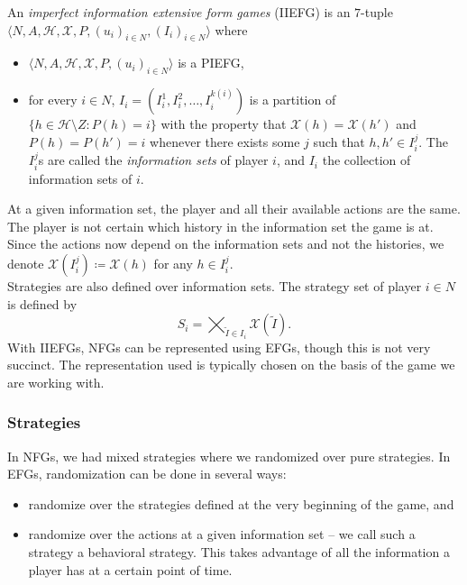 	\begin{fdef}
		An \emph{imperfect information extensive form games} (IIEFG) is an $7$-tuple $\langle N,A,\mathcal{H},\mathcal{X},P,(u_i)_{i\in N},(I_i)_{i \in N}\rangle$ where
		\begin{itemize}
			\item $\langle N,A,\mathcal{H},\mathcal{X},P,(u_i)_{i\in N}\rangle$ is a PIEFG,
			\item for every $i \in N$, $I_i = (I_i^1,I_i^2,\ldots,I_i^{k(i)})$ is a partition of $\{ h \in \mathcal{H} \setminus Z : P(h) = i \}$ with the property that $\mathcal{X}(h) = \mathcal{X}(h')$ and $P(h) = P(h') = i$ whenever there exists some $j$ such that $h,h' \in I_i^j$. The $I_i^j$s are called the \emph{information sets} of player $i$, and $I_i$ the collection of information sets of $i$.
		\end{itemize}
	\end{fdef}

	At a given information set, the player and all their available actions are the same. The player is not certain which history in the information set the game is at.\\
	Since the actions now depend on the information sets and not the histories, we denote $\mathcal{X}(I_i^j) \coloneqq \mathcal{X}(h)$ for any $h \in I_i^j$.\\
	Strategies are also defined over information sets. The strategy set of player $i \in N$ is defined by
	\[ S_i = \bigtimes_{\tilde{I} \in I_i} \mathcal{X}(\tilde{I}). \]
	With IIEFGs, NFGs can be represented using EFGs, though this is not very succinct. The representation used is typically chosen on the basis of the game we are working with.

	\subsubsection{Strategies}

		In NFGs, we had mixed strategies where we randomized over pure strategies. In EFGs, randomization can be done in several ways:
		\begin{itemize}
			\item randomize over the strategies defined at the very beginning of the game, and
			\item randomize over the actions at a given information set -- we call such a strategy a behavioral strategy. This takes advantage of all the information a player has at a certain point of time.
		\end{itemize}

